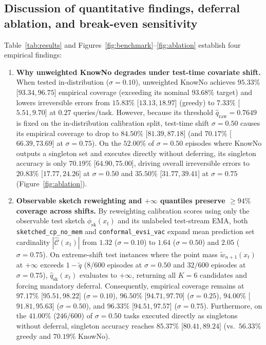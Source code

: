 \documentclass[11pt]{article}
\begin{document}
\subsection{Discussion of quantitative findings, deferral ablation, and break-even sensitivity}

Table~\ref{tab:results} and Figures~\ref{fig:benchmark}--\ref{fig:ablation} establish four empirical findings:
\begin{enumerate}
  \item \textbf{Why unweighted KnowNo degrades under test-time covariate shift.} When tested in-distribution ($\sigma=0.10$), unweighted KnowNo \citep{ren2023knowno} achieves $95.33\%$ [$93.34, 96.75$] empirical coverage (exceeding its nominal $93.68\%$ target) and lowers irreversible errors from $15.83\%$ [$13.13, 18.97$] (greedy) to $7.33\%$ [$5.51, 9.70$] at $0.27$ queries/task. However, because its threshold $\hat{q}_{\mathrm{raw}} = 0.7649$ is fixed on the in-distribution calibration split, test-time shift $\sigma=0.50$ causes its empirical coverage to drop to $84.50\%$ [$81.39, 87.18$] (and $70.17\%$ [$66.39, 73.69$] at $\sigma=0.75$). On the $52.00\%$ of $\sigma=0.50$ episodes where KnowNo outputs a singleton set and executes directly without deferring, its singleton accuracy is only $70.19\%$ [$64.90, 75.00$], driving overall irreversible errors to $20.83\%$ [$17.77, 24.26$] at $\sigma=0.50$ and $35.50\%$ [$31.77, 39.41$] at $\sigma=0.75$ (Figure~\ref{fig:ablation}).
  \item \textbf{Observable sketch reweighting and $+\infty$ quantiles preserve $\ge 94\%$ coverage across shifts.} By reweighting calibration scores using only the observable test sketch $\phi_{\mathrm{sk}}(x_t)$ and its unlabeled test-stream EMA, both \texttt{sketched\_\linebreak[0]cp\_\linebreak[0]no\_\linebreak[0]mem} and \texttt{conformal\_\linebreak[0]evsi\_\linebreak[0]vac} expand mean prediction set cardinality $|\hat{\mathcal{C}}(x_t)|$ from $1.32$ ($\sigma=0.10$) to $1.64$ ($\sigma=0.50$) and $2.05$ ($\sigma=0.75$). On extreme-shift test instances where the point mass $\tilde{w}_{n+1}(x_t)$ at $+\infty$ exceeds $1-\tilde{q}$ ($8/600$ episodes at $\sigma=0.50$ and $32/600$ episodes at $\sigma=0.75$), $\hat{q}_{\mathrm{sk}}(x_t)$ evaluates to $+\infty$, returning all $K=6$ candidates and forcing mandatory deferral. Consequently, empirical coverage remains at $97.17\%$ [$95.51, 98.22$] ($\sigma=0.10$), $96.50\%$ [$94.71, 97.70$] ($\sigma=0.25$), $94.00\%$ [$91.81, 95.63$] ($\sigma=0.50$), and $96.33\%$ [$94.51, 97.57$] ($\sigma=0.75$). Furthermore, on the $41.00\%$ ($246/600$) of $\sigma=0.50$ tasks executed directly as singletons without deferral, singleton accuracy reaches $85.37\%$ [$80.41, 89.24$] (vs.\ $56.33\%$ greedy and $70.19\%$ KnowNo).

\end{enumerate}
\end{document}
